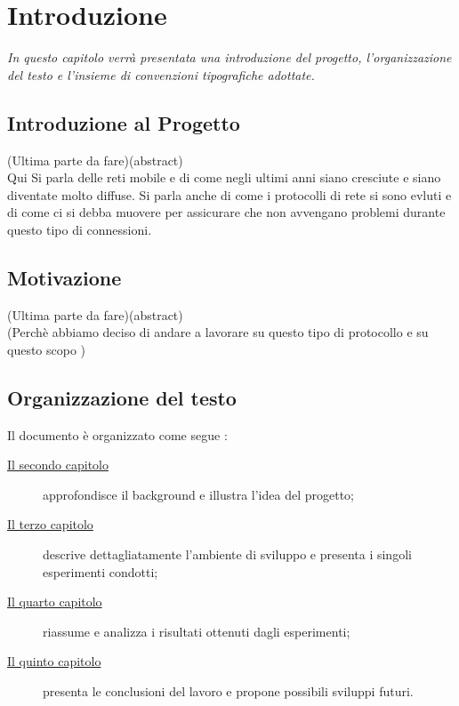 \chapter{Introduzione}
\label{cap:introduzione}

\textit{\indent In questo capitolo verrà presentata una introduzione del progetto, l'organizzazione del testo e l'insieme di convenzioni tipografiche adottate.
}
\section{Introduzione al Progetto}
(Ultima parte da fare)(abstract)\\
Qui Si parla delle reti mobile e di come negli ultimi anni siano cresciute e siano diventate molto diffuse. Si parla anche di come i protocolli di rete si sono evluti e di come ci si debba muovere per assicurare che non avvengano problemi durante questo tipo di connessioni. 


\section{Motivazione}
(Ultima parte da fare)(abstract)\\
(Perchè abbiamo deciso di andare a lavorare su questo tipo di protocollo e su questo scopo )
\section{Organizzazione del testo}

\indent Il documento è organizzato come segue :
\begin{description}
    \item[{\hyperref[cap:descrizione]{Il secondo capitolo}}] approfondisce il background e illustra l'idea del progetto;
    
    \item[{\hyperref[cap:processi-metodologie]{Il terzo capitolo}}] descrive dettagliatamente l'ambiente di sviluppo e presenta i singoli esperimenti condotti;

    \item[{\hyperref[cap:risultati]{Il quarto capitolo}}] riassume e analizza i risultati ottenuti dagli esperimenti;
    
    \item[{\hyperref[cap:conclusioni]{Il quinto capitolo}}] presenta le conclusioni del lavoro e propone possibili sviluppi futuri.
\end{description}

